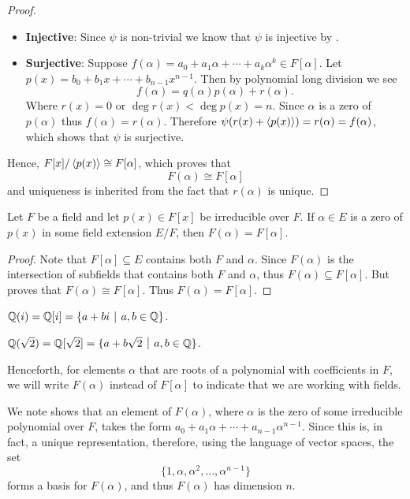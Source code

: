 \begin{proof}
\begin{itemize}
        \item \textbf{Injective}: Since $\psi$ is non-trivial we know that $\psi$ is injective by .

        \item \textbf{Surjective}: Suppose $f(\alpha) = a_0 + a_1\alpha + \cdots + a_k\alpha^k \in F[\alpha]$. Let $p(x) = b_0 + b_1x + \cdots + b_{n-1}x^{n-1}$. Then by polynomial long division we see
        \[
            f(\alpha) = q(\alpha)p(\alpha) + r(\alpha).
        \]
        Where $r(x) = 0$ or $\deg r(x) < \deg p(x) = n$. Since $\alpha$ is a zero of $p(\alpha)$ thus $f(\alpha) = r(\alpha)$. Therefore $\psi(r(x) + \left\langle p(x)\right\rangle) = r(\alpha) = f(\alpha)$, which shows that $\psi$ is surjective.
    \end{itemize}
    Hence, $F[x]/\left\langle p(x)\right\rangle \cong F[\alpha]$, which proves that
    \[
        F(\alpha) \cong F[\alpha]
    \]
    and uniqueness is inherited from the fact that $r(\alpha)$ is unique.
\end{proof}
\begin{corollary}
    Let $F$ be a field and let $p(x) \in F[x]$ be irreducible over $F$. If $\alpha \in E$ is a zero of $p(x)$ in some field extension $E/F$, then $F(\alpha) = F[\alpha]$.
\end{corollary}
\begin{proof}
    Note that $F[\alpha] \subseteq E$ contains both $F$ and $\alpha$. Since $F(\alpha)$ is the intersection of subfields that contains both $F$ and $\alpha$, thus $F(\alpha) \subseteq F[\alpha]$. But  proves that $F(\alpha) \cong F[\alpha]$. Thus $F(\alpha) = F[\alpha]$.
\end{proof}

\begin{example}
    $\Q(i) = \Q[i] = \{a + bi \vert a, b \in \Q\}$.
\end{example}
\begin{example}
    $\Q(\sqrt 2) = \Q[\sqrt{2}] = \{a + b\sqrt{2} \vert a, b \in \Q\}$.
\end{example}

Henceforth, for elements $\alpha$ that are roots of a polynomial with coefficients in $F$, we will write $F(\alpha)$ instead of $F[\alpha]$ to indicate that we are working with fields.

We note  shows that an element of $F(\alpha)$, where $\alpha$ is the zero of some irreducible polynomial over $F$, takes the form $a_0+a_1\alpha + \cdots + a_{n-1}\alpha^{n-1}$. Since this is, in fact, a unique representation, therefore, using the language of vector spaces, the set
\[
    \{1, \alpha, \alpha^2, \dots, \alpha^{n-1}\}
\]
forms a basis for $F(\alpha)$, and thus $F(\alpha)$ has dimension $n$.

